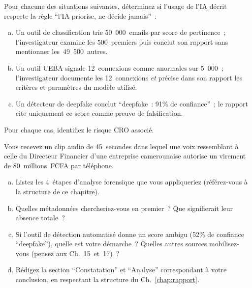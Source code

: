 \bigskip

\begin{boxexo}[title={\ding{45}\quad Exercice~22.1 --- Triage vs décision \niveaubase}]
Pour chacune des situations suivantes, déterminez si l'usage de
l'IA décrit respecte la règle ``l'IA priorise, ne décide jamais''~:
\begin{enumerate}[(a)]
    \item Un outil de classification trie 50~000~emails par score
          de pertinence~; l'investigateur examine les 500~premiers
          puis conclut son rapport sans mentionner les~49~500~autres.
    \item Un outil UEBA signale 12~connexions comme anormales sur
          5~000~; l'investigateur documente les 12~connexions
          \emph{et} précise dans son rapport les critères et
          paramètres du modèle utilisé.
    \item Un détecteur de deepfake conclut ``deepfake~: 91\%
          de confiance''~; le rapport cite uniquement ce score
          comme preuve de falsification.
\end{enumerate}
Pour chaque cas, identifiez le risque CRO associé.
\end{boxexo}

\begin{boxexo}[title={\ding{45}\quad Exercice~22.2 --- Analyse de deepfake \niveaumoyen}]
Vous recevez un clip audio de 45~secondes dans lequel une voix
ressemblant à celle du Directeur Financier d'une entreprise
camerounaise autorise un virement de 80~millions~FCFA par téléphone.
\begin{enumerate}[(a)]
    \item Listez les 4~étapes d'analyse forensique que vous
          appliqueriez (référez-vous à la structure de ce chapitre).
    \item Quelles métadonnées chercheriez-vous en premier~? Que
          signifierait leur absence totale~?
    \item Si l'outil de détection automatisé donne un score
          ambigu (52\% de confiance ``deepfake''), quelle est votre
          démarche~? Quelles autres sources mobilisez-vous
          (pensez aux Ch.~15~et~17)~?
    \item Rédigez la section ``Constatation'' et ``Analyse''
          correspondant à votre conclusion, en respectant
          la structure du Ch.~\ref{chap:rapport}.
\end{enumerate}
\end{boxexo}

